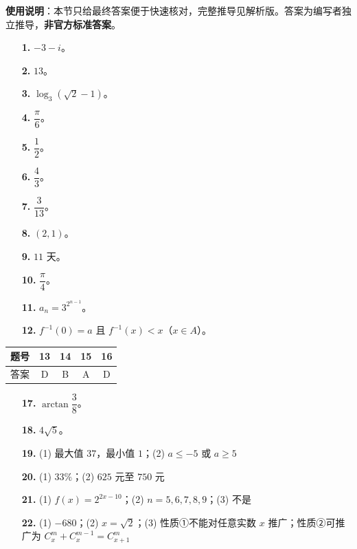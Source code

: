 
\begin{gknotice}
\textbf{使用说明}：本节只给最终答案便于快速核对，完整推导见解析版。答案为编写者独立推导，\textbf{非官方标准答案}。
\end{gknotice}

\begin{itemize}[leftmargin=2.6em]
  \item[\textbf{1.}] $-3-i$。
  \item[\textbf{2.}] $13$。
  \item[\textbf{3.}] $\log_3(\sqrt2-1)$。
  \item[\textbf{4.}] $\dfrac\pi6$。
  \item[\textbf{5.}] $\dfrac12$。
  \item[\textbf{6.}] $\dfrac43$。
  \item[\textbf{7.}] $\dfrac3{13}$。
  \item[\textbf{8.}] $(2,1)$。
  \item[\textbf{9.}] $11$ 天。
  \item[\textbf{10.}] $\dfrac\pi4$。
  \item[\textbf{11.}] $a_n=3^{2^{n-1}}$。
  \item[\textbf{12.}] $f^{-1}(0)=a$ 且 $f^{-1}(x)<x$（$x\in A$）。
\end{itemize}

\begin{center}\begin{tabular}{ccccc}
\toprule
题号 & 13 & 14 & 15 & 16 \\
\midrule
答案 & D & B & A & D \\
\bottomrule
\end{tabular}\end{center}

\begin{itemize}[leftmargin=2.6em]
  \item[\textbf{17.}] $\arctan\dfrac38$。
  \item[\textbf{18.}] $4\sqrt5$。
  \item[\textbf{19.}] (1) 最大值 $37$，最小值 $1$；(2) $a\le-5$ 或 $a\ge5$
  \item[\textbf{20.}] (1) $33\%$；(2) $625$ 元至 $750$ 元
  \item[\textbf{21.}] (1) $f(x)=2^{2x-10}$；(2) $n=5,6,7,8,9$；(3) 不是
  \item[\textbf{22.}] (1) $-680$；(2) $x=\sqrt2$；(3) 性质①不能对任意实数 $x$ 推广；性质②可推广为 $C_x^m+C_x^{m-1}=C_{x+1}^m$
\end{itemize}
